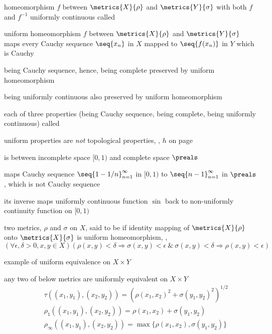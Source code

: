 \documentclass[17pt,landscape]{foils}
\begin{document}
{{	\vitem homeomorphism $f$ between $\metrics{X}{\rho}$ and $\metrics{Y}{\sigma}$ with both $f$ and $f^{-1}$
		uniformly continuous called 
\eit



\bit
	\item uniform homeomorphism $f$ between $\metrics{X}{\rho}$ and $\metrics{Y}{\sigma}$
		maps every Cauchy sequence $\seq{x_n}$ in $X$ mapped to $\seq{f(x_n)}$ in $Y$ which is Cauchy
	\bit
		\item being Cauchy sequence, hence, being complete preserved by {uniform homeomorphism}
		\item being uniformly continuous also preserved by {uniform homeomorphism}
	\eit

	\vitem each of three properties (being Cauchy sequence, being complete, being uniformly continuous)
		called 

	\vitem uniform properties are \emph{not} topological properties, \eg, $h$ on page~\pageref{page:uniform-continuity-metric-spaces}
	\bit
		\item is  between incomplete space $[0,1)$ and complete space $\preals$
		\item maps Cauchy sequence $\seq{1-1/n}_{n=1}^\infty$ in $[0,1)$
				to $\seq{n-1}_{n=1}^\infty$ in $\preals$, which is {not} Cauchy sequence
		\item its inverse maps uniformly continuous function $\sin$ back to non-uniformly continuity function on $[0,1)$
	\eit
\eit



\bit
	\item two metrics, $\rho$ and $\sigma$ on $X$, said to be 
		if identity mapping of $\metrics{X}{\rho}$ onto $\metrics{X}{\sigma}$
		is uniform homeomorphism, \ie,
		\[
			(\forall \epsilon, \delta>0, x,y \in X)
			(\rho(x,y)<\delta \Rightarrow \sigma(x,y)<\epsilon
			\ \&\ %
			\sigma(x,y)<\delta \Rightarrow \rho(x,y)<\epsilon)
		\]

	\vitem example of uniform equivalence on $X\times Y$
	\bit
		\item any two of below metrics are uniformly equivalent on $X\times Y$
		\begin{eqnarray*}
			&&\tau((x_1,y_1),(x_2,y_2)) = (\rho(x_1,x_2)^2 + \sigma(y_1,y_2)^2)^{1/2}
			\\
			&&\rho_1((x_1,y_1),(x_2,y_2)) = \rho(x_1,x_2) + \sigma(y_1,y_2)
			\\
			&&\rho_\infty((x_1,y_1),(x_2,y_2)) = \max\{\rho(x_1,x_2), \sigma(y_1,y_2)\}
		\end{eqnarray*}
	\eit

}}
\end{document}
